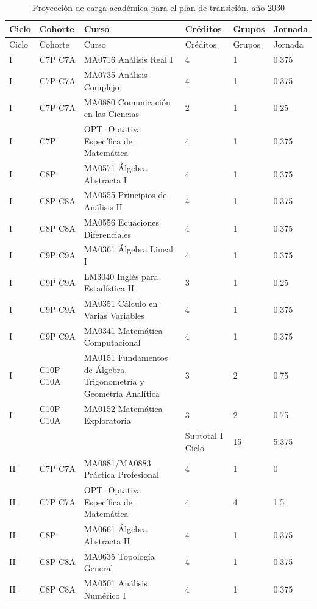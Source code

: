 \begin{longtable}[c]{|p{0.8cm}|p{1.8cm}|p{6.8cm}|p{1.5cm}|p{1.3cm}|p{1.5cm}|}
\caption{Proyección de carga académica para el plan de transición, año 2030}
\label{tab:carga2030}\\
\hline
\rowcolor[HTML]{00C0F3}
Ciclo & Cohorte & Curso & Créditos & Grupos & Jornada \\ \hline
\endfirsthead
\hline
\rowcolor[HTML]{00C0F3}
Ciclo & Cohorte & Curso & Créditos & Grupos & Jornada \\ \hline
\endhead
%
I & C7P C7A & MA0716 Análisis Real I & 4 & 1 & 0.375 \\ \hline
I & C7P C7A & MA0735 Análisis Complejo & 4 & 1 & 0.375 \\ \hline
I & C7P C7A & MA0880 Comunicación en las Ciencias & 2 & 1 & 0.25 \\ \hline
I & C7P & OPT- Optativa Específica de Matemática & 4 & 1 & 0.375 \\ \hline
I & C8P & MA0571 Álgebra Abstracta I & 4 & 1 & 0.375 \\ \hline
I & C8P C8A & MA0555 Principios de Análisis II & 4 & 1 & 0.375 \\ \hline
I & C8P C8A & MA0556 Ecuaciones Diferenciales & 4 & 1 & 0.375 \\ \hline
I & C9P C9A & MA0361 Álgebra Lineal I & 4 & 1 & 0.375 \\ \hline
I & C9P C9A & LM3040 Inglés para Estadística II & 3 & 1 & 0.25 \\ \hline
I & C9P C9A & MA0351 Cálculo en Varias Variables & 4 & 1 & 0.375 \\ \hline
I & C9P C9A & MA0341 Matemática Computacional & 4 & 1 & 0.375 \\ \hline
I & C10P C10A & MA0151 Fundamentos de Álgebra, Trigonometría y Geometría Analítica & 3 & 2 & 0.75 \\ \hline
I & C10P C10A & MA0152 Matemática Exploratoria & 3 & 2 & 0.75 \\ \hline
 &  &  & Subtotal I Ciclo & 15 & 5.375 \\ \hline
II & C7P C7A & MA0881/MA0883 Práctica Profesional & 4 & 1 & 0 \\ \hline
II & C7P C7A & OPT- Optativa Específica de Matemática & 4 & 4 & 1.5 \\ \hline
II & C8P & MA0661 Álgebra Abstracta II & 4 & 1 & 0.375 \\ \hline
II & C8P C8A & MA0635 Topología General & 4 & 1 & 0.375 \\ \hline
II & C8P C8A & MA0501 Análisis Numérico I & 4 & 1 & 0.375 \\ \hline

\end{longtable}
